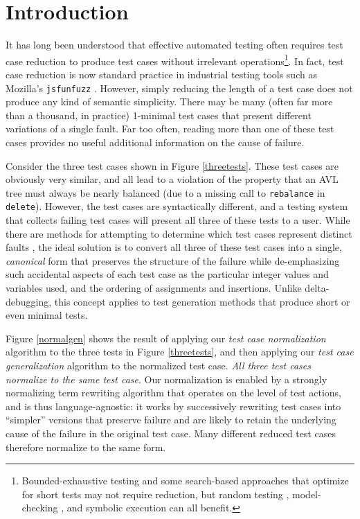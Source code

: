 \section{Introduction}

It has long been understood that effective automated testing often requires
test case reduction \cite{DD,MinUnit,TCminim,ICSEDiff} to produce test cases
without irrelevant operations\footnote{Bounded-exhaustive testing
  \cite{SoftBET} and some search-based approaches that
  optimize for short tests \cite{FA11} may not require reduction, but random
  testing \cite{RandFormal,HamletOnly}, model-checking
  \cite{Gastin04minimizationof}, and symbolic execution \cite{issta14}
  can all benefit.}.  In fact, test case reduction is
now standard practice in industrial testing tools such as Mozilla's
{\tt jsfunfuzz} \cite{jsfunfuzz,jsfunfuzz2,lithium}.  However, simply reducing the length of a test case
does not produce any kind of semantic simplicity.  There may be many
(often far more than a thousand, in practice) 1-minimal test cases
that present different variations of a single fault.  Far too often,
reading more than one of these test cases provides no useful
additional information on the cause of failure. 

Consider the three test cases shown in Figure \ref{threetests}.  These
test cases are obviously very similar, and all lead to a
violation of the property that an AVL tree must always be nearly
balanced (due to a missing call to {\tt rebalance} in {\tt delete}).  However, the test cases are
syntactically different, and a testing system that collects
failing test cases will present all three of these tests to a user.
While there are methods for attempting to determine which test cases
represent distinct faults \cite{PLDI13}, the ideal solution is
to convert all three of these test cases into a single,
\emph{canonical} form that preserves the structure of the failure while de-emphasizing
such accidental aspects of each test case as the particular integer
values and variables used, and the ordering of assignments and
insertions.  Unlike delta-debugging, this concept applies to 
test generation methods that produce short or even minimal tests.

Figure \ref{normalgen} shows the result of applying our \emph{test
  case normalization} algorithm to the three tests in Figure
\ref{threetests}, and then applying our \emph{test case
  generalization} algorithm to the normalized test case.  \emph{All
  three test cases normalize to the same test case}.  Our normalization is
enabled by a strongly normalizing term rewriting algorithm that operates
on the level of test actions, and is thus language-agnostic:
it works by successively rewriting test cases into ``simpler''
versions that preserve failure and are likely to retain the
underlying cause of the failure in the original test case. Many
different reduced test cases therefore normalize to the same form.

